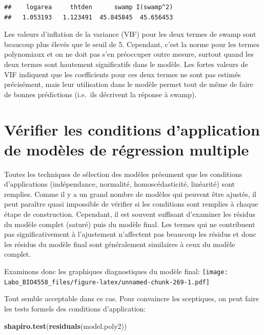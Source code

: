 \documentclass[12pt,]{book}
\newenvironment{Shaded}{\begin{snugshade}}{\end{snugshade}}
\newcommand{\KeywordTok}[1]{\textcolor[rgb]{0.13,0.29,0.53}{\textbf{#1}}}
\newcommand{\NormalTok}[1]{#1}
\begin{document}
\begin{verbatim}
##    logarea     thtden      swamp I(swamp^2) 
##   1.053193   1.123491  45.845845  45.656453
\end{verbatim}

Les valeurs d'inflation de la variance (VIF) pour les deux termes de swamp sont beaucoup plus élevés que le seuil de 5. Cependant, c'est la norme pour les termes polynomiaux et on ne doit pas s'en préoccuper outre mesure, surtout quand les deux termes sont hautement significatifs dans le modèle. Les fortes valeurs de VIF indiquent que les coefficients pour ces deux termes ne sont pas estimés précisément, mais leur utilisation dans le modèle permet tout de même de faire de bonnes prédictions (i.e.~ils décrivent la réponse à swamp).

\hypertarget{vuxe9rifier-les-conditions-dapplication-de-moduxe8les-de-ruxe9gression-multiple}{%
\section{Vérifier les conditions d'application de modèles de régression multiple}\label{vuxe9rifier-les-conditions-dapplication-de-moduxe8les-de-ruxe9gression-multiple}}

Toutes les techniques de sélection des modèles présument que les conditions d'applications (indépendance, normalité, homoscédasticité, linéarité) sont remplies. Comme il y a un grand nombre de modèles qui peuvent être ajustés, il peut paraître quasi impossible de vérifier si les conditions sont remplies à chaque étape de construction. Cependant, il est souvent suffisant d'examiner les résidus du modèle complet (saturé) puis du modèle final. Les termes qui ne contribuent pas significativement à l'ajustement n'affectent pas beaucoup les résidus et donc les résidus du modèle final sont généralement similaires à ceux du modèle complet.

Examinons donc les graphiques diagnostiques du modèle final:
\texttt{[image: Labo\_BIO4558\_files/figure-latex/unnamed-chunk-269-1.pdf]}

Tout semble acceptable dans ce cas. Pour convaincre les sceptiques, on peut faire les tests formels des conditions d'application:

\begin{Shaded}
\begin{Highlighting}[]
\KeywordTok{shapiro.test}\NormalTok{(}\KeywordTok{residuals}\NormalTok{(model.poly2))}
\end{Highlighting}
\end{Shaded}
\end{document}

